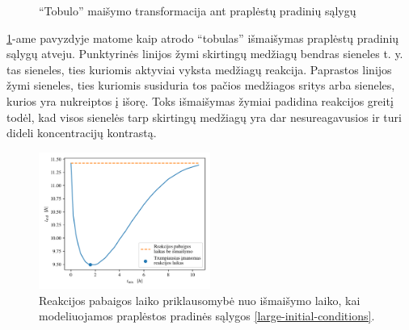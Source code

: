 \begin{figure}[!h]
\caption{\enquote{Tobulo} maišymo transformacija ant praplėstų pradinių sąlygų}
\label{perfect-4x4-mix}
\end{figure}

\ref{perfect-4x4-mix}-ame pavyzdyje matome kaip atrodo \enquote{tobulas} išmaišymas praplėstų pradinių sąlygų atveju. Punktyrinės linijos žymi skirtingų medžiagų bendras sieneles t. y. tas sieneles, ties kuriomis aktyviai vyksta medžiagų reakcija. Paprastos linijos žymi sieneles, ties kuriomis susiduria tos pačios medžiagos sritys arba sieneles, kurios yra nukreiptos į išorę. Toks išmaišymas žymiai padidina reakcijos greitį todėl, kad visos sienelės tarp skirtingų medžiagų yra dar nesureagavusios ir turi dideli koncentracijų kontrastą.

\newpage

\begin{figure}[h!]
    \centering
    \includegraphics[width=0.5\textwidth]{../paper/assets/mix-end-large-1.png}

    \caption{Reakcijos pabaigos laiko priklausomybė nuo išmaišymo laiko, kai modeliuojamos praplėstos pradinės sąlygos \eqref{large-initial-conditions}. }

    \label{mix-end-large}
\end{figure}

